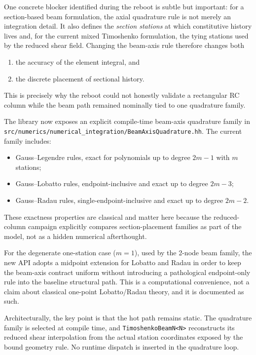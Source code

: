 One concrete blocker identified during the reboot is subtle but important:
for a section-based beam formulation, the axial quadrature rule is not merely
an integration detail. It also defines the \emph{section stations} at which
constitutive history lives and, for the current mixed Timoshenko formulation,
the tying stations used by the reduced shear field. Changing the beam-axis rule
therefore changes both
\begin{enumerate}
  \item the accuracy of the element integral, and
  \item the discrete placement of sectional history.
\end{enumerate}
This is precisely why the reboot could not honestly validate a rectangular RC
column while the beam path remained nominally tied to one quadrature family.

The library now exposes an explicit compile-time beam-axis quadrature family in
\texttt{src/numerics/numerical\_integration/BeamAxisQuadrature.hh}.  The
current family includes:
\begin{itemize}
  \item Gauss--Legendre rules, exact for polynomials up to degree
    \(2m-1\) with \(m\) stations;
  \item Gauss--Lobatto rules, endpoint-inclusive and exact up to degree
    \(2m-3\);
  \item Gauss--Radau rules, single-endpoint-inclusive and exact up to degree
    \(2m-2\).
\end{itemize}
These exactness properties are classical
\cite{Crisfield1991_NLFEA_Vol1,bathe2014_FiniteElementProcedures} and matter
here because the reduced-column campaign explicitly compares section-placement
families as part of the model, not as a hidden numerical afterthought.

For the degenerate one-station case (\(m=1\)), used by the 2-node beam family,
the new API adopts a midpoint extension for Lobatto and Radau in order to keep
the beam-axis contract uniform without introducing a pathological endpoint-only
rule into the baseline structural path. This is a computational convenience,
not a claim about classical one-point Lobatto/Radau theory, and it is
documented as such.

Architecturally, the key point is that the hot path remains static. The
quadrature family is selected at compile time, and
\texttt{TimoshenkoBeamN<N>} reconstructs its reduced shear interpolation from
the actual station coordinates exposed by the bound geometry rule. No runtime
dispatch is inserted in the quadrature loop.

